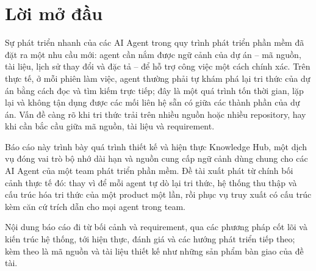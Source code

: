 \section*{Lời mở đầu}

Sự phát triển nhanh của các AI Agent trong quy trình phát triển phần mềm đã đặt ra một nhu cầu mới: agent cần nắm được ngữ cảnh của dự án -- mã nguồn, tài liệu, lịch sử thay đổi và đặc tả -- để hỗ trợ công việc một cách chính xác. Trên thực tế, ở mỗi phiên làm việc, agent thường phải tự khám phá lại tri thức của dự án bằng cách đọc và tìm kiếm trực tiếp; đây là một quá trình tốn thời gian, lặp lại và không tận dụng được các mối liên hệ sẵn có giữa các thành phần của dự án. Vấn đề càng rõ khi tri thức trải trên nhiều nguồn hoặc nhiều repository, hay khi cần bắc cầu giữa mã nguồn, tài liệu và requirement.

Báo cáo này trình bày quá trình thiết kế và hiện thực Knowledge Hub, một dịch vụ đóng vai trò bộ nhớ dài hạn và nguồn cung cấp ngữ cảnh dùng chung cho các AI Agent của một team phát triển phần mềm. Đề tài xuất phát từ chính bối cảnh thực tế đó: thay vì để mỗi agent tự dò lại tri thức, hệ thống thu thập và cấu trúc hóa tri thức của một product một lần, rồi phục vụ truy xuất có cấu trúc kèm căn cứ trích dẫn cho mọi agent trong team.

Nội dung báo cáo đi từ bối cảnh và requirement, qua các phương pháp cốt lõi và kiến trúc hệ thống, tới hiện thực, đánh giá và các hướng phát triển tiếp theo; kèm theo là mã nguồn và tài liệu thiết kế như những sản phẩm bàn giao của đề tài.
